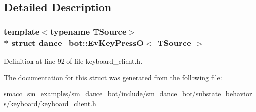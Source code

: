 \subsection{Detailed Description}
\subsubsection*{template$<$typename T\+Source$>$\\*
struct dance\+\_\+bot\+::\+Ev\+Key\+Press\+O$<$ T\+Source $>$}



Definition at line 92 of file keyboard\+\_\+client.\+h.



The documentation for this struct was generated from the following file\+:\begin{DoxyCompactItemize}
\item 
smacc\+\_\+sm\+\_\+examples/sm\+\_\+dance\+\_\+bot/include/sm\+\_\+dance\+\_\+bot/substate\+\_\+behaviors/keyboard/\hyperlink{keyboard__client_8h}{keyboard\+\_\+client.\+h}\end{DoxyCompactItemize}
